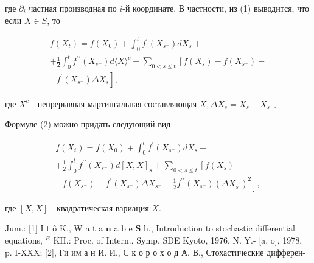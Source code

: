 \documentclass[10pt]{article}
\begin{document}
где $\partial_{i}$ частная производная по $i$-й координате. В частности, из (1) выводится, что если $X \in S$, то



\[

\begin{gathered}

f\left(X_{t}\right)=f\left(X_{0}\right)+\int_{0}^{t} f^{\prime}\left(X_{s^{-}}\right) d X_{s}+ \\

+\frac{1}{2} \int_{0}^{t} f^{\prime \prime}\left(X_{s^{-}}\right) d\langle X\rangle^{c}+\sum_{0<s \leqslant t}\left[f\left(X_{s}\right)-f\left(X_{s^{-}}\right)-\right. \\

\left.-f^{\prime}\left(X_{s^{-}}\right) \Delta X_{s}\right],

\end{gathered}

\]



где $X^{c}$ - непрерывная мартингальная составляющая $X, \Delta X_{s}=X_{s}-X_{s^{-} \cdot}$



Формуле (2) можно придать следующий вид:



\[

\begin{gathered}

f\left(X_{t}\right)=f\left(X_{0}\right)+\int_{0}^{t} f^{\prime}\left(X_{s^{-}}\right) d X_{s}+ \\

+\frac{1}{2} \int_{0}^{t} f^{\prime \prime}\left(X_{s^{-}}\right) d[X, X]_{s}+\sum_{0<s \leqslant t}\left[f\left(X_{s}\right)-\right. \\

\left.-f\left(X_{s^{-}}\right)-f^{\prime}\left(X_{s^{-}}\right) \Delta X_{s^{-}}-\frac{1}{2} f^{\prime \prime}\left(X_{s^{-}}\right)\left(\Delta X_{s^{\prime}}\right)^{2}\right],

\end{gathered}

\]



где $[X, X]$ - квадратическая вариация $X$.



Jum.: [1] I t ô K., W a $\mathrm{t}$ a $\mathbf{n}$ a b e $\mathbf{S}$ h., Introduction to stochastic differential equations, ${ }^{B}$ KH.: Proc. of Intern., Symp. SDE Kyoto, 1976, N. Y.- [a. o], 1978, p. I-XXX; [2], Ги им а н И. И., С к о р о х о д А. В., Стохастические дифферен-
\end{document}
